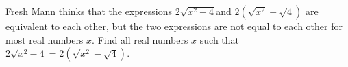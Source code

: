 Fresh Mann thinks that the expressions $2\sqrt{x^2 -4} $and $2(\sqrt{x^2} -\sqrt4)$ are equivalent to each other, but the two expressions are not equal to each other for most real numbers $x$. Find all real numbers $x$ such that $2\sqrt{x^2 -4} = 2(\sqrt{x^2} -\sqrt4)$.
